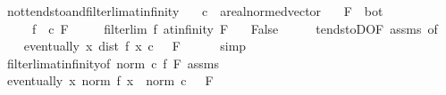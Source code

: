\begin{isabellebody}
\ not{\isacharunderscore}{\kern0pt}tendsto{\isacharunderscore}{\kern0pt}and{\isacharunderscore}{\kern0pt}filterlim{\isacharunderscore}{\kern0pt}at{\isacharunderscore}{\kern0pt}infinity{\isacharcolon}{\kern0pt}\isanewline
\ \ \ c\ {\isacharcolon}{\kern0pt}{\isacharcolon}{\kern0pt}\ {\isachardoublequoteopen}{\isacharprime}{\kern0pt}a{\isacharcolon}{\kern0pt}{\isacharcolon}{\kern0pt}real{\isacharunderscore}{\kern0pt}normed{\isacharunderscore}{\kern0pt}vector{\isachardoublequoteclose}\isanewline
\ \ \ {\isachardoublequoteopen}F\ {\isasymnoteq}\ bot{\isachardoublequoteclose}\isanewline
\ \ \ \ \ {\isachardoublequoteopen}{\isacharparenleft}{\kern0pt}f\ {\isasymlonglongrightarrow}\ c{\isacharparenright}{\kern0pt}\ F{\isachardoublequoteclose}\isanewline
\ \ \ \ \ {\isachardoublequoteopen}filterlim\ f\ at{\isacharunderscore}{\kern0pt}infinity\ F{\isachardoublequoteclose}\isanewline
\ \ \ False\isanewline
%
\isadelimproof
%
\endisadelimproof
%
\isatagproof
{}\isamarkupfalse%
\ {\isacharminus}{\kern0pt}\isanewline
\ \ \isamarkupfalse%
\ tendstoD{\isacharbrackleft}{\kern0pt}OF\ assms{\isacharparenleft}{\kern0pt}{}{\isacharparenright}{\kern0pt}{\isacharcomma}{\kern0pt}\ of\ {\isachardoublequoteopen}{}{\isacharslash}{\kern0pt}{}{\isachardoublequoteclose}{\isacharbrackright}{\kern0pt}\isanewline
\ \ \isamarkupfalse%
\ {\isachardoublequoteopen}eventually\ {\isacharparenleft}{\kern0pt}{\isasymlambda}x{\isachardot}{\kern0pt}\ dist\ {\isacharparenleft}{\kern0pt}f\ x{\isacharparenright}{\kern0pt}\ c\ {\isacharless}{\kern0pt}\ {}{\isacharslash}{\kern0pt}{}{\isacharparenright}{\kern0pt}\ F{\isachardoublequoteclose}\isanewline
\ \ \ \ \isamarkupfalse%
\ simp\isanewline
\ \ \isamarkupfalse%
\isanewline
\ \ \isamarkupfalse%
\ filterlim{\isacharunderscore}{\kern0pt}at{\isacharunderscore}{\kern0pt}infinity{\isacharbrackleft}{\kern0pt}of\ {\isachardoublequoteopen}norm\ c{\isachardoublequoteclose}\ f\ F{\isacharbrackright}{\kern0pt}\ assms{\isacharparenleft}{\kern0pt}{}{\isacharparenright}{\kern0pt}\isanewline
\ \ \isamarkupfalse%
\ {\isachardoublequoteopen}eventually\ {\isacharparenleft}{\kern0pt}{\isasymlambda}x{\isachardot}{\kern0pt}\ norm\ {\isacharparenleft}{\kern0pt}f\ x{\isacharparenright}{\kern0pt}\ {\isasymge}\ norm\ c\ {\isacharplus}{\kern0pt}\ {}{\isacharparenright}{\kern0pt}\ F{\isachardoublequoteclose}\ \isamarkupfalse%

\end{isabellebody}
